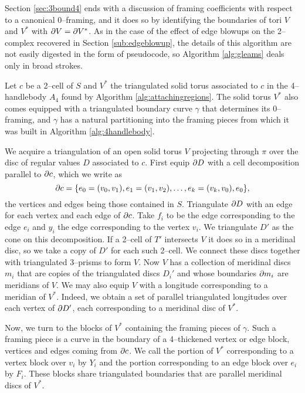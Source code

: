 Section \ref{sec:3bound4} ends with a discussion of framing coefficients with respect to a canonical 0--framing, and it does so by identifying the boundaries of tori $V$ and $V^*$ with $\partial V = \partial V^*$.
As in the case of the effect of edge blowups on the 2--complex recovered in Section \ref{sub:edgeblowup}, the details of this algorithm are not easily digested in the form of pseudocode, so Algorithm \ref{alg:gleams} deals only in broad strokes.

Let $c$ be a 2--cell of $S$ and $V^*$ the triangulated solid torus associated to $c$ in the 4--handlebody $A_4$ found by Algorithm \ref{alg:attachingregions}.
The solid torus $V^*$ also comes equipped with a triangulated boundary curve $\gamma$ that determines its 0--framing, and $\gamma$ has a natural partitioning into the framing pieces from which it was built in Algorithm \ref{alg:4handlebody}.

We acquire a triangulation of an open solid torus $V$ projecting through $\pi$ over the disc of regular values $D$ associated to $c$.
First equip $\partial D$ with a cell decomposition parallel to $\partial c$, which we write as
\[
	\partial c=\{e_0=(v_0,v_1),e_1=(v_1,v_2),\dots,e_k=(v_k,v_0),e_0\},
\]
the vertices and edges being those contained in $S$.
Triangulate $\partial D$ with an edge for each vertex and each edge of $\partial c$.
Take $f_i$ to be the edge corresponding to the edge $e_i$ and $y_i$ the edge corresponding to the vertex $v_i$.
We triangulate $D'$ as the cone on this decomposition.
If a 2--cell of $T'$ intersects $V$ it does so in a meridinal disc, so we take a copy of $D'$ for each such 2--cell.
We connect these discs together with triangulated 3--prisms to form $V$.
Now $V$ has a collection of meridinal discs $m_i$ that are copies of the triangulated discs $D_i'$ and whose boundaries $\partial m_i$ are meridians of $V$. 
We may also equip $V$ with a longitude corresponding to a meridian of $V^*$.
Indeed, we obtain a set of parallel triangulated longitudes over each vertex of $\partial D'$, each corresponding to a meridinal disc of $V^*$.

Now, we turn to the blocks of $V^*$ containing the framing pieces of $\gamma$.
Such a framing piece is a curve in the boundary of a 4--thickened vertex or edge block, vertices and edges coming from $\partial c$.
We call the portion of $V^*$ corresponding to a vertex block over $v_i$ by $Y_i$ and the portion corresponding to an edge block over $e_i$ by $F_i$.
These blocks share triangulated boundaries that are parallel meridinal discs of $V^*$.

